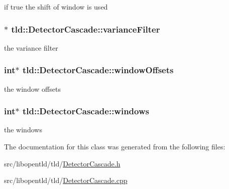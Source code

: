 if true the shift of window is used 

\hypertarget{classtld_1_1DetectorCascade_a5d2600fc22f6cc39ef1940457324c5eb}{
\subsubsection[{variance\-Filter}]{$\ast$ tld\-::\-Detector\-Cascade\-::variance\-Filter}}\label{classtld_1_1DetectorCascade_a5d2600fc22f6cc39ef1940457324c5eb}


the variance filter 

\hypertarget{classtld_1_1DetectorCascade_a259b095591f3d09904277ff844d94b0b}{
\subsubsection[{window\-Offsets}]{\setlength{\rightskip}{0pt plus 5cm}int$\ast$ tld\-::\-Detector\-Cascade\-::window\-Offsets}}\label{classtld_1_1DetectorCascade_a259b095591f3d09904277ff844d94b0b}


the window offsets 

\hypertarget{classtld_1_1DetectorCascade_a0acc3bf212228a7b3d47b2d795f1a5a4}{
\subsubsection[{windows}]{\setlength{\rightskip}{0pt plus 5cm}int$\ast$ tld\-::\-Detector\-Cascade\-::windows}}\label{classtld_1_1DetectorCascade_a0acc3bf212228a7b3d47b2d795f1a5a4}


the windows 



The documentation for this class was generated from the following files\-:\begin{DoxyCompactItemize}
\item 
src/libopentld/tld/\hyperlink{DetectorCascade_8h}{Detector\-Cascade.\-h}\item 
src/libopentld/tld/\hyperlink{DetectorCascade_8cpp}{Detector\-Cascade.\-cpp}\end{DoxyCompactItemize}
